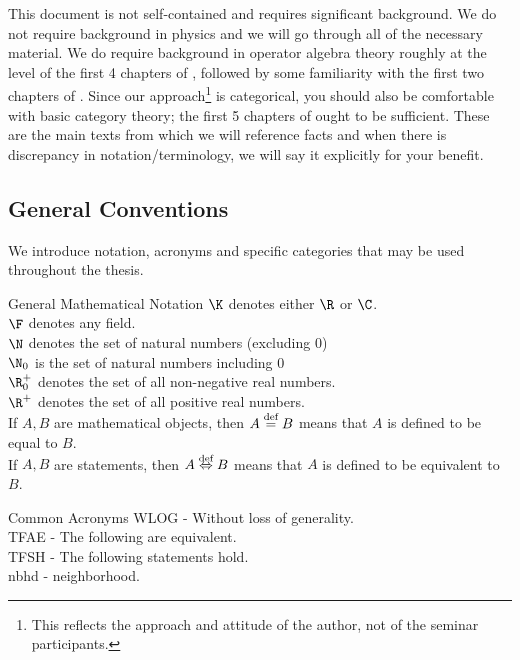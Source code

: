 \documentclass[preamble.tex]{subfiles}
\begin{document}
This document is not self-contained and requires significant background. We do not require background in physics and we will go through all of the necessary material. We do require background in operator algebra theory roughly at the level of the first 4 chapters of \cite{murphy2014c}, followed by some familiarity with the first two chapters of \cite{brownozawaCstarAlgFinDimAppr}. Since our approach\footnote{This reflects the approach and attitude of the author, not of the seminar participants.} is categorical, you should also be comfortable with basic category theory; the first 5 chapters of \cite{riehlcatincontext} ought to be sufficient. These are the main texts from which we will reference facts and when there is discrepancy in notation/terminology, we will say it explicitly for your benefit. 


\subsection{General Conventions}\label{subsec: general conventions}

We introduce notation, acronyms and specific categories that may be used throughout the thesis.

\vspace{1pt}

\begin{filingbox}{\large General Mathematical Notation}{}
$\K$ denotes either $\R$ or $\C$.\\
$\F$ denotes any field.\\
$\N$ denotes the set of natural numbers (excluding $0$)\\
$\N_0$ is the set of natural numbers including $0$\\
$\R^+_0$ denotes the set of all non-negative real numbers.\\
$\R^+$ denotes the set of all positive real numbers.\\
If $A,B$ are mathematical objects, then $A \stackrel{\text{def}}{=} B$ means that $A$ is defined to be equal to $B$.\\ 
If $A,B$ are statements, then $A \defiff B$ means that $A$ is defined to be equivalent to $B$.
\end{filingbox}

\vspace{1pt}

\begin{filingbox}{\large Common Acronyms}{}
WLOG - Without loss of generality.\\
TFAE - The following are equivalent.\\ 
TFSH - The following statements hold.\\
nbhd - neighborhood.
\end{filingbox}
\end{document}
